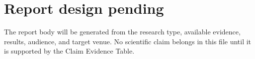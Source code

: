 
\section*{Report design pending}

The report body will be generated from the research type, available evidence,
results, audience, and target venue. No scientific claim belongs in this file
until it is supported by the Claim Evidence Table.
